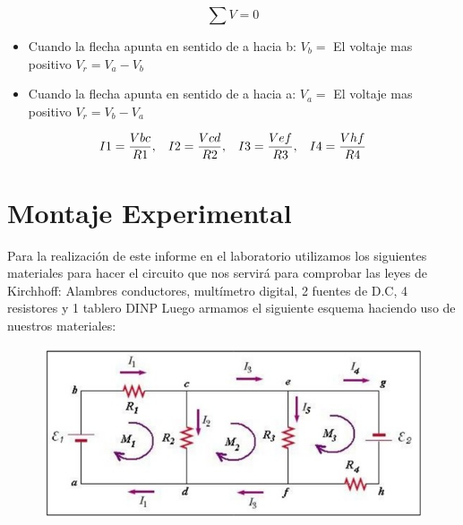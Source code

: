 \documentclass[letterpaper, 12pt]{article}
\begin{document}
\begin{equation}
	\sum V = 0
\end{equation}

\begin{itemize}[label=$\triangleright$]
	\item Cuando la flecha apunta en sentido de a hacia b: \hfill
	      \break{} $V_b =$ El voltaje mas positivo $V_r = V_a - V_b$
	\item Cuando la flecha apunta en sentido de a hacia a: \hfill
	      \break{} $V_a =$ El voltaje mas positivo $V_r = V_b - V_a$
\end{itemize}

\begin{equation}
	\begin{gathered}
		I1 = \frac{Vbc}{R1}, \hspace*{.3cm}
		I2 = \frac{Vcd}{R2}, \hspace*{.3cm}
		I3 = \frac{Vef}{R3}, \hspace*{.3cm}
		I4 = \frac{Vhf}{R4}
	\end{gathered}
\end{equation}

\section{Montaje Experimental}

Para la realización de este informe en el laboratorio
utilizamos los siguientes materiales para hacer el circuito
que nos servirá para comprobar las leyes de Kirchhoff:
Alambres conductores, multímetro digital, 2 fuentes de D.C,
4 resistores y 1 tablero DINP Luego armamos el siguiente
esquema haciendo uso de nuestros materiales:

\begin{figure}[H]
	\centering
	\includegraphics[scale = .5]{./Images/Imagen1.jpeg}
\end{figure}
\end{document}
